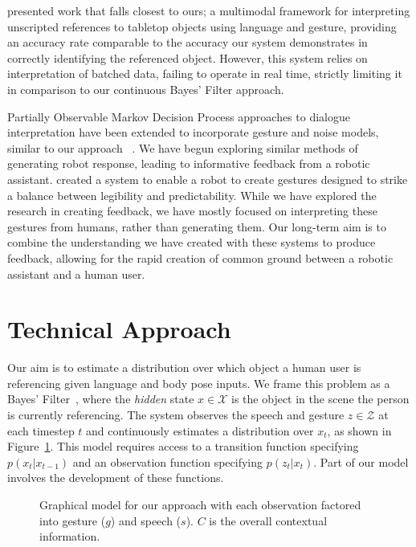\documentclass[a4paper, 11pt]{article} %
\begin{document}
\citet{matuszek14} presented work that falls closest to ours; a multimodal framework for interpreting unscripted references to tabletop objects using language and gesture, providing an accuracy rate comparable to the accuracy our system demonstrates in correctly identifying the referenced object. However, this system relies on interpretation of batched data, failing to operate in real time, strictly limiting it in comparison to our continuous Bayes' Filter approach.

Partially Observable Markov Decision Process approaches to dialogue interpretation have been extended to incorporate gesture and noise models, similar to our approach~\citep{young13, young10} . We have begun exploring similar methods of generating robot response, leading to informative feedback from a robotic assistant. \citet{dragan13} created a system to enable a robot to create gestures designed to strike a balance between legibility and predictability. While we have explored the research in creating feedback, we have mostly focused on interpreting these gestures from humans, rather than generating them. Our long-term aim is to combine the understanding we have created with these systems to produce feedback, allowing for the rapid creation of common ground between a robotic assistant and a human user.

\section{Technical Approach}
Our aim is to estimate a distribution over which object a human user is referencing given language and body pose inputs. We frame this problem as a Bayes' Filter~\citep{thrun08}, where the \textit{hidden} state $x \in \mathcal{X}$ is the object in the scene the person is currently referencing. The system observes the speech and gesture $z \in \mathcal{Z}$ at each timestep $t$ and continuously estimates a distribution over $x_t$, as shown in Figure~\ref{fig:model}. This model requires access to a transition function specifying $p(x_t | x_{t-1})$ and an observation function specifying $p(z_t | x_t)$. Part of our model involves the development of these functions.

\begin{figure}[h]
\centering
{}
\caption{Graphical model for our approach with each observation factored into gesture ($g$) and speech ($s$). $C$ is the overall contextual information.\label{fig:model}}
\end{figure}
\end{document}
